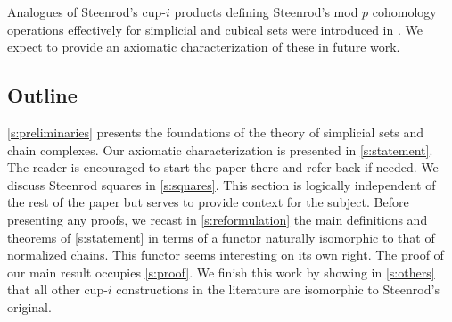 Analogues of Steenrod's \mbox{cup-$i$} products defining Steenrod's mod $p$ cohomology operations effectively for simplicial and cubical sets were introduced in \cite{medina2021may_st}.
We expect to provide an axiomatic characterization of these in future work.

\subsection*{Outline}

\cref{s:preliminaries} presents the foundations of the theory of simplicial sets and chain complexes.
Our axiomatic characterization is presented in \cref{s:statement}.
The reader is encouraged to start the paper there and refer back if needed.
We discuss Steenrod squares in \cref{s:squares}.
This section is logically independent of the rest of the paper but serves to provide context for the subject.
Before presenting any proofs, we recast in \cref{s:reformulation} the main definitions and theorems of \cref{s:statement} in terms of a functor naturally isomorphic to that of normalized chains.
This functor seems interesting on its own right.
The proof of our main result occupies \cref{s:proof}.
We finish this work by showing in \cref{s:others} that all other \mbox{cup-$i$} constructions in the literature are isomorphic to Steenrod's original.

